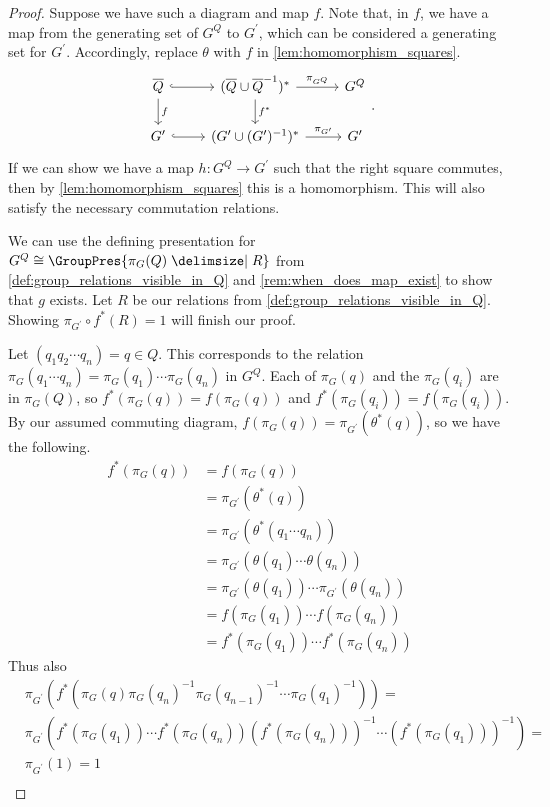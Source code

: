 \begin{proof}
	Suppose we have such a diagram and map $f$.
	Note that, in $f$, we have a map from the generating set of $G^Q$ to $G^\prime$, which can be considered a generating set for $G^\prime$.
	Accordingly, replace $\theta$ with  $f$ in \cref{lem:homomorphism_squares}.
	\[
		\begin{tikzcd}
			\overline{Q} \ar[d, "f"] \ar[r, hook] & (\overline{Q} \cup \overline{Q}^{-1})^* \ar[d, "f^*"] \ar[r, "\pi_{G^Q}"] & G^Q \\
			G^\prime \ar[r, hook] & (G^\prime \cup (G^\prime)^{-1})^* \ar[r, "\pi_{G^\prime}"] & G^\prime
		\end{tikzcd}
		.\]
	If we can show we have a map $h \colon G^Q \to G^\prime$ such that the right square commutes, then by \cref{lem:homomorphism_squares} this is a homomorphism.
	This will also satisfy the necessary commutation relations.

	We can use the defining presentation for $G^Q \cong \GroupPres{\pi_G(Q) \relations R}$ from \cref{def:group_relations_visible_in_Q} and \cref{rem:when_does_map_exist} to show that $g$ exists.
	Let $R$ be our relations from \cref{def:group_relations_visible_in_Q}.
	Showing $\pi_{G^\prime} \circ f^*\left( R \right) = 1 $ will finish our proof.

	Let $(q_1q_2\cdots q_n) = q \in Q$.
	This corresponds to the relation $\pi_G(q_1\cdots q_n) = \pi_G(q_1)\cdots \pi_G(q_n) $ in $G^Q$.
	Each of $\pi_G(q)$ and the  $\pi_G(q_i)$ are in  $\pi_G(Q)$, so  $f^*(\pi_G(q)) = f(\pi_G(q))$ and  $f^*(\pi_G(q_i)) = f(\pi_G(q_i))$.
	By our assumed commuting diagram,  $f(\pi_G(q)) = \pi_{G^\prime}(\theta^*(q))$, so we have the following.
	\begin{align*}
		f^*(\pi_G(q)) & = f(\pi_G(q))                                                    \\
		              & = \pi_{G^\prime}(\theta^*(q))                                    \\
		              & = \pi_{G^\prime}(\theta^*(q_1\cdots q_n))                        \\
		              & = \pi_{G^\prime}(\theta(q_1) \cdots \theta(q_n))                 \\
		              & = \pi_{G^\prime}(\theta(q_1)) \cdots \pi_{G^\prime}(\theta(q_n)) \\
		              & = f(\pi_G(q_1)) \cdots f(\pi_G(q_n))                             \\
		              & = f^*(\pi_G(q_1)) \cdots f^*(\pi_G(q_n))
	\end{align*}
	Thus also
	\begin{align*}
		 & \pi_{G^\prime}(f^*(\pi_G(q)\pi_G(q_n)^{-1}\pi_G(q_{n-1})^{-1} \cdots \pi_G(q_1)^{-1})) =                   \\
		 & \pi_{G^\prime}(f^*(\pi_G(q_1))\cdots f^*(\pi_G(q_n))(f^*(\pi_G(q_n)))^{-1}\cdots (f^*(\pi_G(q_1)))^{-1}) = \\
		 & \pi_{G^\prime}(1)  = 1                                                                                     \\
	\end{align*}
\end{proof}

